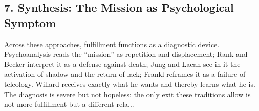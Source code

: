 \documentclass[12pt]{article}
\begin{document}
\subsection*{7. Synthesis: The Mission as Psychological Symptom}
Across these approaches, fulfillment functions as a diagnostic device. Psychoanalysis reads the ``mission'' as repetition and displacement; Rank and Becker interpret it as a defense against death; Jung and Lacan see in it the activation of shadow and the return of lack; Frankl reframes it as a failure of teleology. Willard receives exactly what he wants and thereby learns what he is. The diagnosis is severe but not hopeless: the only exit these traditions allow is not more fulfillment but a different rela...

\printbibliography
\end{document}
